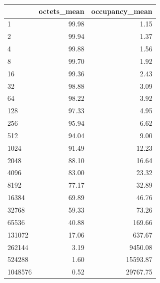 \begin{tabular}{lrr}
\toprule
 & octets_mean & occupancy_mean \\
\midrule
1 & 99.98 & 1.15 \\
2 & 99.94 & 1.37 \\
4 & 99.88 & 1.56 \\
8 & 99.70 & 1.92 \\
16 & 99.36 & 2.43 \\
32 & 98.88 & 3.09 \\
64 & 98.22 & 3.92 \\
128 & 97.33 & 4.95 \\
256 & 95.94 & 6.62 \\
512 & 94.04 & 9.00 \\
1024 & 91.49 & 12.23 \\
2048 & 88.10 & 16.64 \\
4096 & 83.00 & 23.32 \\
8192 & 77.17 & 32.89 \\
16384 & 69.89 & 46.76 \\
32768 & 59.33 & 73.26 \\
65536 & 40.88 & 169.66 \\
131072 & 17.06 & 637.67 \\
262144 & 3.19 & 9450.08 \\
524288 & 1.60 & 15593.87 \\
1048576 & 0.52 & 29767.75 \\
\bottomrule
\end{tabular}
